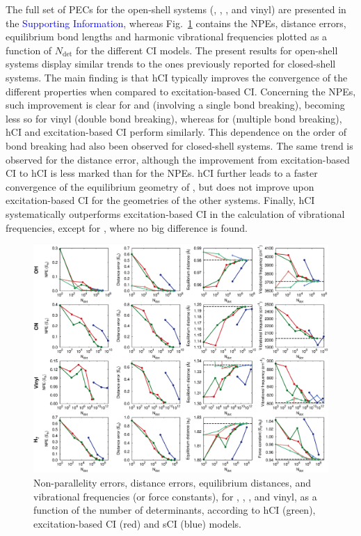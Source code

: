 \documentclass[aip,jcp,reprint,noshowkeys,superscriptaddress]{revtex4-1}
\newcommand{\SupInf}{\textcolor{blue}{Supporting Information}}
\newcommand{\Ndet}{N_\text{det}}
\begin{document}
The full set of PECs for the open-shell systems (, , , and vinyl) are presented in the {\SupInf},
whereas Fig.~\ref{fig:plot_all} contains the NPEs, distance errors, equilibrium bond lengths and harmonic vibrational frequencies plotted as a function of $\Ndet$ for the different CI models.
The present results for open-shell systems display similar trends to the ones previously reported for closed-shell systems. \cite{Kossoski_2022}
The main finding is that hCI typically improves the convergence of the different properties when compared to excitation-based CI.
Concerning the NPEs, such improvement is clear for  and  (involving a single bond breaking), becoming less so for vinyl (double bond breaking),
whereas for  (multiple bond breaking), hCI and excitation-based CI perform similarly.
This dependence on the order of bond breaking had also been observed for closed-shell systems. \cite{Kossoski_2022}
The same trend is observed for the distance error, although the improvement from excitation-based CI to hCI is less marked than for the NPEs.
hCI further leads to a faster convergence of the equilibrium geometry of , but does not improve upon excitation-based CI for the geometries of the other systems.
Finally, hCI systematically outperforms excitation-based CI in the calculation of vibrational frequencies, except for , where no big difference is found.

\begin{figure}%
\includegraphics[width=1.0\linewidth]{plot_all}
\caption{
Non-parallelity errors, distance errors, equilibrium distances, and vibrational frequencies (or force constants), for , , , and vinyl,
as a function of the number of determinants, according to hCI (green), excitation-based CI (red) and sCI (blue) models.}
\label{fig:plot_all}
\end{figure}
\end{document}
